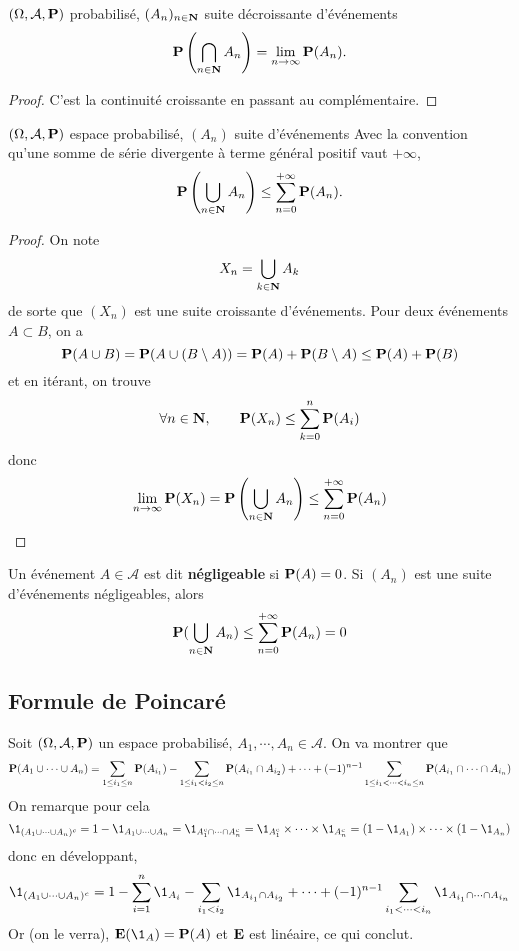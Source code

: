 \begin{thm}
    \Hyp $(\Omega, \mathcal A, \P)$ probabilisé, $(A_n)_{n\in \N}$ suite décroissante d'événements
    \Conc \[
        \P\left(\bigcap_{n\in \N}A_n \right)=\lim_{n \to \infty} \P(A_n).
    \]
\end{thm}

\begin{proof}
    C'est la continuité croissante en passant au complémentaire.
\end{proof}

\begin{thm}
    \Hyp $(\Omega, \mathcal A, \P)$ espace probabilisé, $(A_n)$ suite d'événements
    \Conc Avec la convention qu'une somme de série divergente à terme général positif vaut $+\infty$, \[
        \P\left( \bigcup_{n \in  \N}A_n  \right) \leq \sum_{n=0}^{+\infty} \P(A_n).
    \] 
\end{thm}

\begin{proof}
    On note \[
    X_n=\bigcup_{k\in \N}A_k 
    \] 
    de sorte que $(X_n)$ est une suite croissante d'événements. Pour deux événements $A\subset B$, on a \[
        \P(A\cup B)=\P(A\cup(B\setminus A))=\P(A)+\P(B\setminus A)\leq \P(A)+\P(B)
    \] 
    et en itérant, on trouve \[
        \forall n \in  \N, \qquad \P(X_n)\leq \sum_{k=0}^{n} \P(A_i)
    \] 
    donc \[
        \lim_{n \to \infty} \P(X_n) = \P\left( \bigcup_{n\in \N} A_n \right) \leq \sum_{n=0}^{+\infty} \P(A_n)
    \] 
\end{proof}

\begin{rem}
    Un événement $A\in \mathcal A$ est dit \textbf{négligeable} si $\P(A)=0$. Si $(A_n)$ est une suite d'événements négligeables, alors \[
        \P(\bigcup_{n\in \N}A_n )\leq \sum_{n=0}^{+\infty} \P(A_n)=0
    \] 
\end{rem}

\subsection{Formule de Poincaré}

Soit $(\Omega, \mathcal A, \P)$ un espace probabilisé, $A_1, \cdots, A_n \in  \mathcal A$. On va montrer que \[
    \P(A_1\cup \cdots \cup A_n)=\sum_{1\leq i_1\leq n}\P(A_{i_1})-\sum_{1\leq i_1<i_2\leq n}\P(A_{i_1}\cap A_{i_2}) +\cdots +(-1)^{n-1}\sum_{1\leq i_1<\cdots <i_n\leq n}\P(A_{i_1}\cap \cdots \cap A_{i_n})
\] 
On remarque pour cela \[
    \1_{(A_1\cup \cdots \cup A_n)^c}=1-\1_{A_1\cup \cdots \cup A_n}=\1_{A_1^c\cap \cdots \cap A_n^c}=\1_{A_1^c}\times \cdots \times \1_{A_n^c}=(1-\1_{A_1})\times \cdots \times (1-\1_{A_n})
\]
donc en développant, \[
    \1_{(A_1\cup \cdots \cup A_n)^c} = 1-\sum_{i=1}^n\1_{A_i}-\sum_{i_1<i_2}\1_{A_{i_1}\cap A_{i_2}}+\cdots +(-1)^{n-1}\sum_{i_1<\cdots <i_n}\1_{A_{i_1}\cap\cdots\cap A_{i_n}}
\]
Or (on le verra), $\E(\1_A)=\P(A)$ et $\E$ est linéaire, ce qui conclut.


